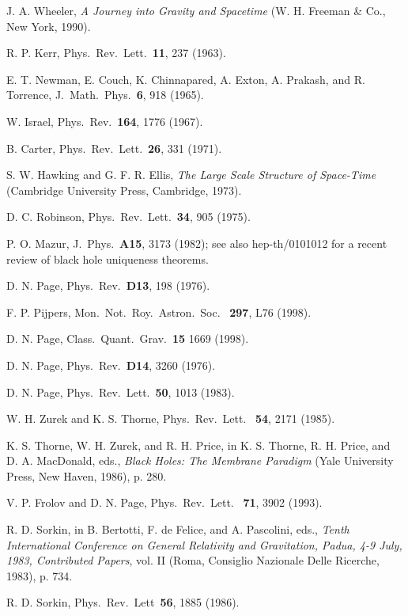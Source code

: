 \documentclass[12pt]{article} \usepackage{latexsym}
\begin{document}
\begin{thebibliography}{99}
 J. A. Wheeler, \emph{A Journey into Gravity and
  Spacetime} (W. H. Freeman \& Co., New York, 1990).

 R. P. Kerr, Phys.\ Rev.\ Lett.\ {\bf 11}, 237 (1963).

 E. T. Newman, E. Couch, K. Chinnapared, A. Exton,
  A. Prakash, and R. Torrence, J.\ Math.\ Phys.\ {\bf 6}, 918 (1965).

 W. Israel, Phys.\ Rev.\ {\bf 164}, 1776 (1967).

 B. Carter,  Phys.\ Rev.\ Lett.\ {\bf 26}, 331 (1971).

 S. W. Hawking and G. F. R. Ellis, \emph{The Large Scale
  Structure of Space-Time} (Cambridge University Press, Cambridge,
  1973).

 D. C. Robinson, Phys.\ Rev.\ Lett.\ {\bf 34}, 905
  (1975).

 P. O. Mazur, J.\ Phys.\ {\bf A15}, 3173 (1982); see
  also hep-th/0101012 for a recent review of black hole uniqueness
  theorems.

 D. N. Page, Phys.\ Rev.\ {\bf D13}, 198 (1976).

 F. P. Pijpers, Mon.\ Not.\ Roy.\ Astron.\ Soc.\ {\bf
  297}, L76 (1998).

 D. N. Page, Class.\ Quant.\ Grav.\ {\bf 15} 1669 (1998).

 D. N. Page, Phys.\ Rev.\ {\bf D14}, 3260 (1976).

 D. N. Page, Phys.\ Rev.\ Lett.\ {\bf 50}, 1013
  (1983).

 W. H. Zurek and K. S. Thorne, Phys.\ Rev.\ Lett.\ {\bf
  54}, 2171 (1985).

 K. S. Thorne, W. H. Zurek, and R. H. Price, in
  K. S. Thorne, R. H. Price, and D. A. MacDonald, eds., \emph{Black
  Holes: The Membrane Paradigm} (Yale University Press, New Haven,
  1986), p. 280.

 V. P. Frolov and D. N. Page, Phys.\ Rev.\ Lett.\ {\bf
  71}, 3902 (1993).

 R. D. Sorkin, in B. Bertotti, F. de Felice, and
  A. Pascolini, eds., \emph{Tenth International Conference on General
  Relativity and Gravitation, Padua, 4-9 July, 1983, Contributed
  Papers}, vol. II (Roma, Consiglio Nazionale Delle Ricerche,
  1983), p. 734.

 R. D. Sorkin, Phys.\ Rev.\ Lett\ {\bf 56}, 1885 (1986).


\end{thebibliography}
\end{document}
